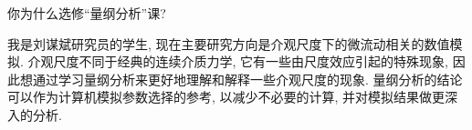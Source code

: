 \begin{problem}[02]
你为什么选修``量纲分析''课?
\end{problem}
\begin{solution}
我是刘谋斌研究员的学生, 现在主要研究方向是介观尺度下的微流动相关的数值模拟. 介观尺度不同于经典的连续介质力学, 它有一些由尺度效应引起的特殊现象, 因此想通过学习量纲分析来更好地理解和解释一些介观尺度的现象. 量纲分析的结论可以作为计算机模拟参数选择的参考, 以减少不必要的计算, 并对模拟结果做更深入的分析.
\end{solution}

